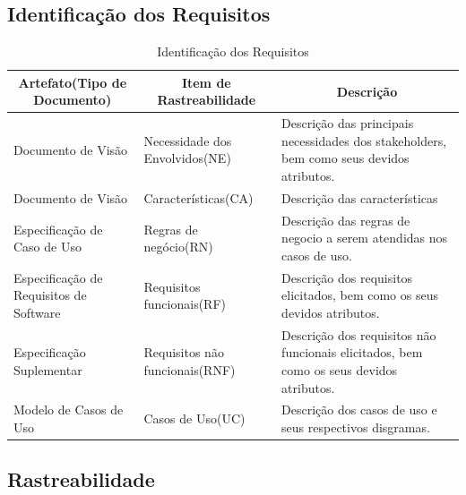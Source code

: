 \begin{apendicesenv}
\subsection{Identificação dos Requisitos}

\begin{table}[!h]
  \centering
  \caption{Identificação dos Requisitos}
  \label{identificação_dos_requisitos}
  \begin{tabular}{|p{4cm}|p{5cm}|p{6cm}|}
    \hline
    \multicolumn{1}{|c|}{\textbf{Artefato(Tipo de Documento)}} & \multicolumn{1}{c|}{\textbf{Item de Rastreabilidade}} & \multicolumn{1}{c|}{\textbf{Descrição}} \\ \hline
    Documento de Visão                      & Necessidade dos Envolvidos(NE)   & Descrição das principais necessidades dos stakeholders, bem como seus devidos atributos. \\ \hline
    Documento de Visão                      & Características(CA)              & Descrição das características                                                            \\ \hline
    Especificação de Caso de Uso            & Regras de negócio(RN)            & Descrição das regras de negocio a serem atendidas nos casos de uso.                      \\ \hline
    Especificação de Requisitos de Software & Requisitos funcionais(RF)        & Descrição dos requisitos elicitados, bem como os seus devidos atributos.                 \\ \hline
    Especificação Suplementar               & Requisitos não funcionais(RNF)   & Descrição dos requisitos não funcionais elicitados, bem como os seus devidos atributos.  \\ \hline
    Modelo de Casos de Uso                  & Casos de Uso(UC)                 & Descrição dos casos de uso e seus respectivos disgramas.                                 \\ \hline
  \end{tabular}
\end{table}

\clearpage{}

\subsection {Rastreabilidade}


\end{apendicesenv}
